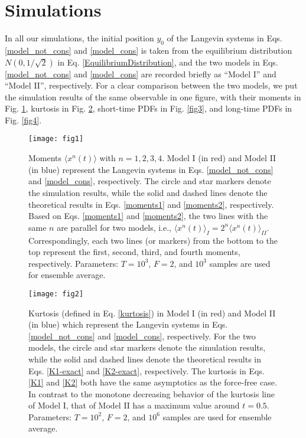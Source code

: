 \documentclass[aps,pre,twocolumn,groupedaddress,longbibliography]{revtex4-2}
\begin{document}
\section{Simulations}\label{Sec6}
In all our simulations, the initial position $y_0$ of the Langevin systems in Eqs. \eqref{model_not_cons} and \eqref{model_cons} is taken from the equilibrium distribution $N(0,1/\sqrt{2})$ in Eq. \eqref{EquilibriumDistribution}, and the two models in Eqs. \eqref{model_not_cons} and \eqref{model_cons} are recorded briefly as ``Model I'' and ``Model II'', respectively.
For a clear comparison between the two models, we put the simulation results of the same observable in one figure, with their moments in Fig. \ref{fig1}, kurtosis in Fig. \ref{fig2}, short-time PDFs in Fig. \ref{fig3}, and long-time PDFs in Fig. \ref{fig4}.

\begin{figure}
  \centering
  \texttt{[image: fig1]}\\
  \caption{Moments $\langle x^n(t)\rangle$ with $n=1,2,3,4$. Model I (in red) and Model II (in blue) represent the Langevin systems in Eqs. \eqref{model_not_cons} and \eqref{model_cons}, respectively.
  The circle and star markers denote the simulation results, while the solid and dashed lines denote the theoretical results in Eqs. \eqref{moments1} and \eqref{moments2}, respectively. Based on Eqs. \eqref{moments1} and \eqref{moments2}, the two lines with the same $n$ are parallel for two models, i.e., $\langle x^n(t)\rangle_I=2^n\langle x^n(t)\rangle_{I\!I}$. Correspondingly, each two lines (or markers) from the bottom to the top represent the first, second, third, and fourth moments, respectively. Parameters: $T=10^3$, $F=2$, and $10^3$ samples are used for ensemble average.
}\label{fig1}
\end{figure}

\begin{figure}
  \centering
  \texttt{[image: fig2]}\\
  \caption{Kurtosis (defined in Eq. \eqref{kurtosis}) in Model I (in red) and Model II (in blue) which represent the Langevin systems in Eqs. \eqref{model_not_cons} and \eqref{model_cons}, respectively. For the two models, the circle and star markers denote the simulation results, while the solid and dashed lines denote the theoretical results in Eqs. \eqref{K1-exact} and \eqref{K2-exact}, respectively. The kurtosis in Eqs. \eqref{K1} and \eqref{K2} both have the same asymptotics as the force-free case.
In contrast to the monotone decreasing behavior of the kurtosis line of Model I, that of Model II has a maximum value around $t=0.5$. Parameters: $T=10^2$, $F=2$, and $10^6$ samples are used for ensemble average.
}\label{fig2}
\end{figure}
\end{document}
